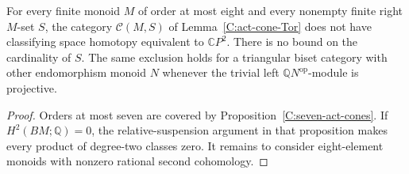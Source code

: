\begin{proposition}
\label{C:eight-act-cones}
For every finite monoid $M$ of order at most eight and every
nonempty finite right $M$-set $S$, the category $\mathcal C(M,S)$
of Lemma~\ref{C:act-cone-Tor} does not have classifying space
homotopy equivalent to $\mathbb CP^2$.
There is no bound on the cardinality of $S$.
The same exclusion holds for a triangular biset category with
other endomorphism monoid $N$ whenever the trivial left
$\mathbb QN^{\mathrm{op}}$-module is projective.
\end{proposition}
\begin{proof}
Orders at most seven are covered by
Proposition~\ref{C:seven-act-cones}. If
$H^2(BM;\mathbb Q)=0$, the relative-suspension argument in
that proposition makes every product of degree-two classes
zero. It remains to consider eight-element monoids with
nonzero rational second cohomology.


\end{proof}
